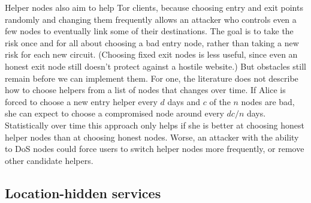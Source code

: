 \documentclass{llncs}
\begin{document}
Helper nodes also aim to help Tor clients, because choosing entry and exit
points
randomly and changing them frequently allows an attacker who controls
even a few nodes to eventually link some of their destinations. The goal
is to take the risk once and for all about choosing a bad entry node,
rather than taking a new risk for each new circuit. (Choosing fixed
exit nodes is less useful, since even an honest exit node still doesn't
protect against a hostile website.) But obstacles still remain before
we can implement them.
For one, the literature does not describe how to choose helpers from a list
of nodes that changes over time.  If Alice is forced to choose a new entry
helper every $d$ days and $c$ of the $n$ nodes are bad, she can expect
to choose a compromised node around
every $dc/n$ days. Statistically over time this approach only helps
if she is better at choosing honest helper nodes than at choosing
honest nodes.  Worse, an attacker with the ability to DoS nodes could
force users to switch helper nodes more frequently, or remove
other candidate helpers.


%
%


\subsection{Location-hidden services}
\label{subsec:hidden-services}
\end{document}
